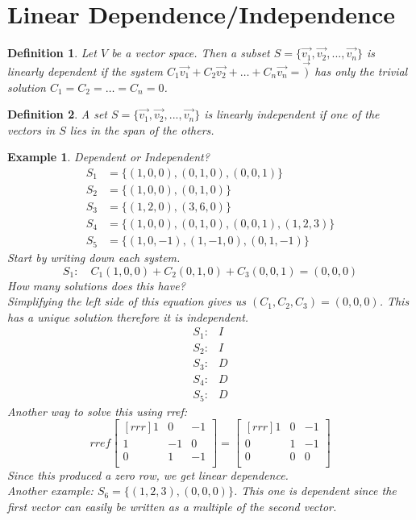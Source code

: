 \documentclass{report}
\newtheorem*{ex}{Example}
\newtheorem*{defn}{Definition}
\begin{document}
\section{Linear Dependence/Independence}
\begin{defn}
Let $V$ be a vector space. Then a subset $S=\{\vec{v_1},\vec{v_2},...,\vec{v_n}\}$ is linearly dependent if the system $C_1\vec{v_1}+C_2\vec{v_2}+\dots+C_n\vec{v_n} = \vec{)}$ has only the trivial solution $C_1 = C_2 = \dots = C_n = 0$.
\end{defn}
\begin{defn}
A set $S=\{\vec{v_1},\vec{v_2},...,\vec{v_n}\}$ is linearly independent if one of the vectors in $S$ lies in the span of the others.
\end{defn}
\begin{ex}
Dependent or Independent?\\
\begin{align*}
S_1&=\{(1,0,0),(0,1,0),(0,0,1)\}\\
S_2&=\{(1,0,0),(0,1,0)\}\\
S_3&=\{(1,2,0),(3,6,0)\}\\
S_4&=\{(1,0,0),(0,1,0),(0,0,1),(1,2,3)\}\\
S_5&=\{(1,0,-1),(1,-1,0),(0,1,-1)\}
\end{align*}
Start by writing down each system.
\[ S_1: \quad C_1(1,0,0)+C_2(0,1,0)+C_3(0,0,1)=(0,0,0) \]
How many solutions does this have?\\
Simplifying the left side of this equation gives us $(C_1,C_2,C_3)=(0,0,0)$. This has a unique solution therefore it is independent.
\begin{align*}
S_1: &I\\ S_2: &I\\ S_3: &D\\ S_4: &D\\ S_5: &D
\end{align*}
Another way to solve this using rref:
\[ rref \begin{bmatrix}[rrr]1&0&-1\\1&-1&0\\0&1&-1\\ \end{bmatrix} = \begin{bmatrix}[rrr] 1&0&-1\\0&1&-1\\0&0&0\\ \end{bmatrix} \]
Since this produced a zero row, we get linear dependence.\\
Another example: $S_6=\{(1,2,3),(0,0,0)\}$. This one is dependent since the first vector can easily be written as a multiple of the second vector.
\end{ex}
\end{document}
